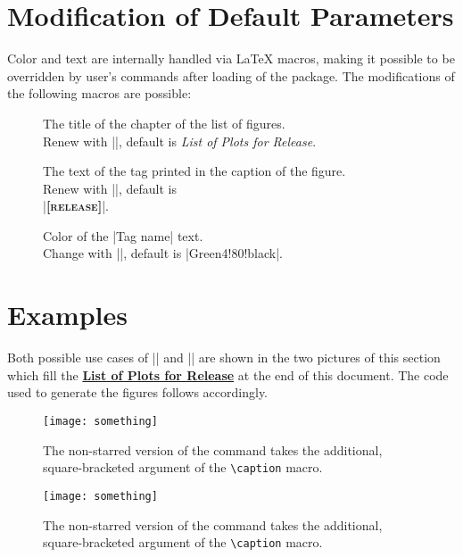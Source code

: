 \documentclass[article,oneside]{memoir}  %
\begin{document}
\section{Modification of Default Parameters} %
\label{sec:modification}
Color and text are internally handled via \LaTeX{} macros, making it possible to be overridden by user's commands after loading of the package. The modifications of the following macros are possible:
\begin{description}
	\item[\codeLATEX{\RPChapterTitle}] The title of the chapter of the list of figures.\\
	Renew with \codeLATEX|\renewcommand{\RPChapterTitle}{New Chapter Title}|, default is \emph{List of Plots for Release}.
	\item[\codeLATEX{\RPText}] The text of the tag printed in the caption of the figure.\\
	Renew with \codeLATEX|\renewcommand{\RPText}{Tag name}|, default is\\
	\codeLATEX|\textcolor{RPTagColor}{\textsc{\textbf{[release]}}}\xspace|.
	\item[] Color of the \codeLATEX|\RPText| text.\\
	Change with \codeLATEX||, default is \codeLATEX|Green4!80!black|.
\end{description}

\section{Examples} %
\label{sec:examples}
Both possible use cases of \codeLATEX|\plotRelease| and \codeLATEX|\plotRelease*| are shown in the two pictures of this section which fill the \textbf{\hyperref[lorp]{List of Plots for Release}} at the end of this document. The code used to generate the figures follows accordingly.

\begin{figure}[h]
	\centering
	\texttt{[image: something]}
	\caption[Optional Argument]{\plotRelease The non-starred version of the command takes the additional, square-bracketed argument of the \texttt{\textbackslash caption} macro.}
\end{figure}

\begin{codeLATEXblock}
\begin{figure}[h]
	\centering
	\texttt{[image: something]}
	\caption[Optional Argument]{\plotRelease The non-starred version of the command takes the additional, square-bracketed argument of the \texttt{\textbackslash caption} macro.
	}
\end{figure}
\end{codeLATEXblock}
\end{document}
